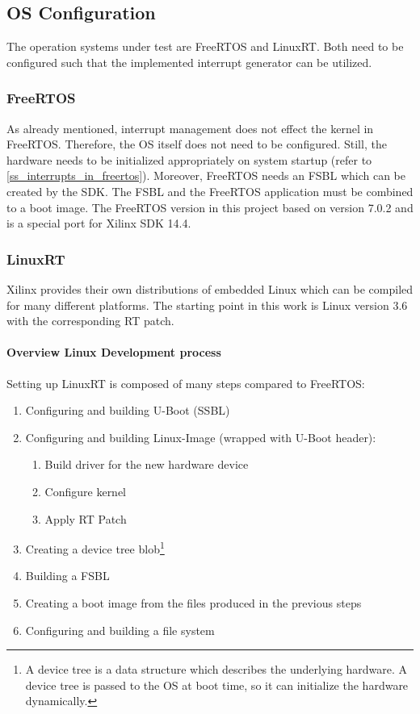 \subsection{\ac{OS} Configuration}
The operation systems under test are FreeRTOS and LinuxRT.
Both need to be configured such that the implemented interrupt generator can be utilized.

\subsubsection{FreeRTOS}
As already mentioned, interrupt management does not effect the kernel in FreeRTOS.
Therefore, the \ac{OS} itself does not need to be configured.
Still, the hardware needs to be initialized appropriately on system startup (refer to \ref{ss_interrupts_in_freertos}). 
Moreover, FreeRTOS needs an \ac{FSBL} which can be created by the \ac{SDK}.
The \ac{FSBL} and the FreeRTOS application must be combined to a boot image.
The FreeRTOS version in this project based on version 7.0.2 and is a special port for Xilinx \ac{SDK} 14.4.

\subsubsection{LinuxRT}
Xilinx provides their own distributions of embedded Linux which can be compiled for many different platforms. 
The starting point in this work is Linux version 3.6 with the corresponding RT patch.

\paragraph{Overview Linux Development process}
Setting up LinuxRT is composed of many steps compared to FreeRTOS:
\begin{enumerate}
	\item Configuring and building U-Boot (\ac{SSBL})
	\item Configuring and building Linux-Image (wrapped with U-Boot header):
		\begin{enumerate}
			\item Build driver for the new hardware device
			\item Configure kernel
			\item Apply RT Patch
		\end{enumerate}
	\item Creating a device tree blob\footnote{A device tree is a data structure which describes the underlying hardware. A device tree is passed to the \ac{OS} at boot time, so it can initialize the hardware dynamically.\cite{device_tree}}
	\item Building a \ac{FSBL}
	\item Creating a boot image from the files produced in the previous steps
	\item Configuring and building a file system
\end{enumerate}

